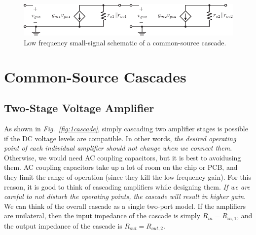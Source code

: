 \begin{figure}[H]
\centering
\includegraphics[scale=1.1]{2cs_casc_ss}
\caption{Low frequency small-signal schematic of a common-source cascade.}
\label{fig:2cs_casc_ss}
\end{figure}
\section{Common-Source Cascades}
\subsection{Two-Stage Voltage Amplifier}
As shown in \emph{Fig.~\ref{fig:1cascade}}, simply cascading two amplifier stages is possible if the DC voltage levels are compatible. In other words, \textit{the desired operating point of each individual amplifier should not change when we connect them}.  Otherwise, we would need AC coupling capacitors, but it is best to avoidusing them.  AC coupling capacitors take up a lot of room on the chip or PCB, and they limit the range of operation (since they kill the low frequency gain).  For this reason, it is good to think of cascading amplifiers while designing them.  \textit{If we are careful to not disturb the operating points, the cascade will result in higher gain}.  We can think of the overall cascade as a single two-port model.  If the amplifiers are unilateral, then the input impedance of the cascade is simply $R_{in} = R_{in,1}$, and the output impedance of the cascade is $R_{out} = R_{out,2}$.
